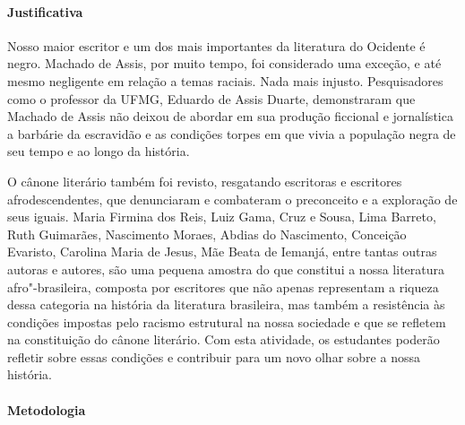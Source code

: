 \documentclass[12pt]{extarticle}
\begin{document}


\paragraph{Justificativa} Nosso maior escritor e um dos mais importantes
da literatura do Ocidente é negro. Machado de Assis, por muito tempo,
foi considerado uma exceção, e até mesmo negligente em relação a temas
raciais. Nada mais injusto. Pesquisadores como o professor da UFMG,
Eduardo de Assis Duarte, demonstraram que Machado de Assis não deixou de
abordar em sua produção ficcional e jornalística a barbárie da
escravidão e as condições torpes em que vivia a população negra de seu
tempo e ao longo da história.

O cânone literário também foi revisto, resgatando escritoras e
escritores afrodescendentes, que denunciaram e combateram o preconceito
e a exploração de seus iguais. Maria Firmina dos Reis, Luiz Gama, Cruz e
Sousa, Lima Barreto, Ruth Guimarães, Nascimento Moraes, Abdias do
Nascimento, Conceição Evaristo, Carolina Maria de Jesus, Mãe Beata de
Iemanjá, entre tantas outras autoras e autores, são uma pequena amostra
do que constitui a nossa literatura afro"-brasileira, composta por
escritores que não apenas representam a riqueza dessa categoria na
história da literatura brasileira, mas também a resistência às condições
impostas pelo racismo estrutural na nossa sociedade e que se refletem na
constituição do cânone literário. Com esta atividade, os estudantes
poderão refletir sobre essas condições e contribuir para um novo olhar
sobre a nossa história.

\paragraph{Metodologia}
\end{document}
